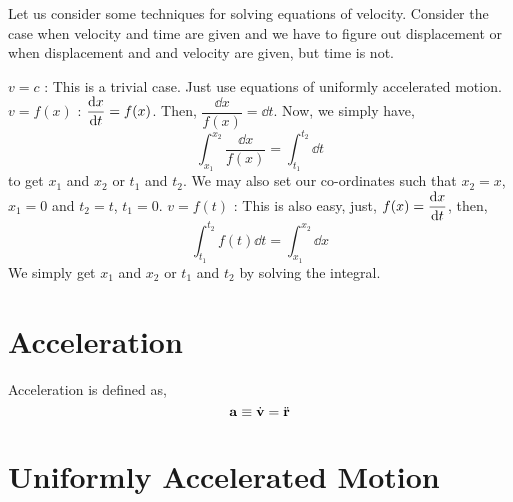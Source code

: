\begin{algorithm}
    Let us consider some techniques for solving equations of velocity. Consider the case when velocity and time are given
    and we have to figure out displacement or when displacement and and velocity are given, but time is not. 
    \begin{enumerate}
        \ii \(v = c\) : This is a trivial case. Just use equations of uniformly accelerated motion.
        \ii \(v = f(x)\) : \(\displaystyle \dv{x}{t} = f(x)\). Then, \(\dfrac{\dd{x}}{f(x)} = \dd{t}\).
        Now, we simply have, \[
            \int^{x_2}_{x_1} \frac{\dd{x}}{f(x)} = \int^{t_2}_{t_1} \dd{t}
        \] to get \(x_1\) and \(x_2\) or \(t_1\) and \(t_2\). We may also set our co-ordinates such that \(x_2 = x\), \(x_1 = 0\) and \(t_2 = t\), \(t_1 = 0\).
        \ii \(v = f(t)\) : This is also easy, just, \(\displaystyle f(x) = \dv{x}{t}\), then,
        \[
            \int^{t_2}_{t_1} f(t) \dd{t} = \int^{x_2}_{x_1} \dd{x}
        \] We simply get \(x_1\) and \(x_2\) or \(t_1\) and \(t_2\) by solving the integral.
    \end{enumerate}
\end{algorithm}

\section{Acceleration}



\begin{definition}
    [Acceleration]
    \label{def: acceleration}
    Acceleration is defined as,
    \begin{equation}
        \boldsymbol{\mathbf{a}} \equiv \dot{\boldsymbol{\mathbf{v}}} = \ddot{\boldsymbol{\mathbf{r}}}    
    \end{equation}
\end{definition}


\section{Uniformly Accelerated Motion}

